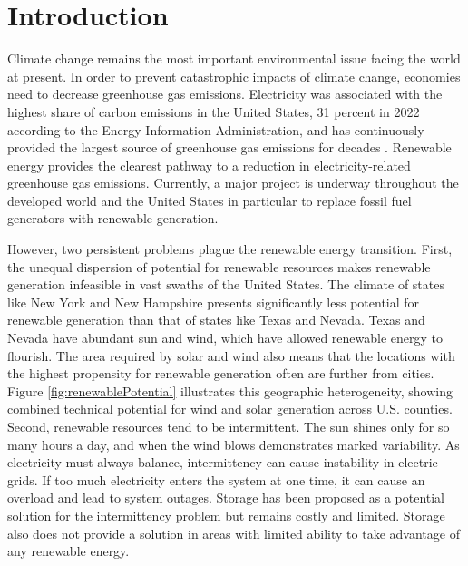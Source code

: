 \documentclass[12pt]{article}
\begin{document}
\doublespacing


\section{Introduction} \label{sec:introduction}

Climate change remains the most important environmental issue facing the world at present. In order to prevent catastrophic impacts of climate change, economies need to decrease greenhouse gas emissions. Electricity was associated with the highest share of carbon emissions in the United States, 31 percent in 2022 according to the Energy Information Administration, and has continuously provided the largest source of greenhouse gas emissions for decades \autocite{EIAReport}. Renewable energy provides the clearest pathway to a reduction in electricity-related greenhouse gas emissions. Currently, a major project is underway throughout the developed world and the United States in particular to replace fossil fuel generators with renewable generation.

However, two persistent problems plague the renewable energy transition. First, the unequal dispersion of potential for renewable resources makes renewable generation infeasible in vast swaths of the United States. The climate of states like New York and New Hampshire presents significantly less potential for renewable generation than that of states like Texas and Nevada. Texas and Nevada have abundant sun and wind, which have allowed renewable energy to flourish. The area required by solar and wind also means that the locations with the highest propensity for renewable generation often are further from cities. Figure \ref{fig:renewablePotential} illustrates this geographic heterogeneity, showing combined technical potential for wind and solar generation across U.S. counties. Second, renewable resources tend to be intermittent. The sun shines only for so many hours a day, and when the wind blows demonstrates marked variability. As electricity must always balance, intermittency can cause instability in electric grids. If too much electricity enters the system at one time, it can cause an overload and lead to system outages. Storage has been proposed as a potential solution for the intermittency problem but remains costly and limited. Storage also does not provide a solution in areas with limited ability to take advantage of any renewable energy.
\end{document}
